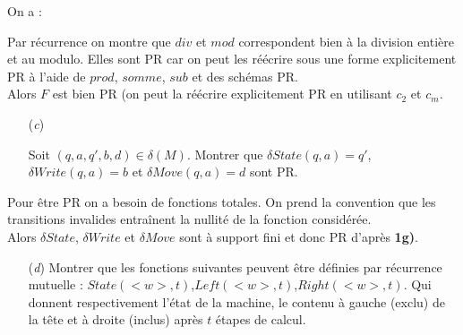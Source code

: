 \documentclass[12pt,letterpaper,boxed]{hmcpset}
\newcommand*\widefbox[1]{\fbox{\hspace{2em}#1\hspace{2em}}}
\begin{document}
\begin{solution}[b)]

On a : 




Par récurrence on montre que $div$ et $mod$ correspondent bien à la division entière et au modulo. Elles sont PR car on peut les réécrire sous une forme explicitement PR à l'aide de $prod$, $somme$, $sub$ et des schémas PR. \\
Alors $F$ est bien PR (on peut la réécrire explicitement PR en utilisant $c_{2}$ et $c_{m}$.

\end{solution}


\begin{problem}
\begin{itemize}
  \item[(\textit{c})] 
  
  Soit $(q,a,q',b,d) \in \delta(M)$. Montrer que $\delta State(q,a) = q'$,  $\delta Write(q,a) = b$ et $\delta Move(q,a) = d$ sont PR.
    
   \end{itemize}
\end{problem}

\begin{solution}[c)]

Pour être PR on a besoin de fonctions totales. On prend la convention que les transitions invalides entraînent la nullité de la fonction considérée.\\
Alors $\delta State$, $\delta Write$ et $\delta Move$ sont à support fini et donc PR d'après \textbf{1g)}.

\end{solution}
\newpage 
\begin{problem}
\begin{itemize}
  \item[(\textit{d})] 
  Montrer que les fonctions suivantes peuvent être définies par récurrence mutuelle :
  $State(<w>,t)$,$Left(<w>,t)$,$Right(<w>,t)$. Qui donnent respectivement l'état de la machine, le contenu à gauche (exclu) de la tête et à droite (inclus) après $t$ étapes de calcul.
   \end{itemize}
\end{problem}
\end{document}
